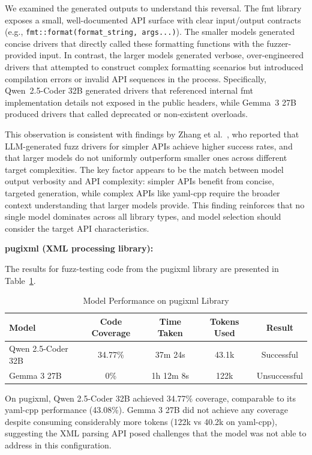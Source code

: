 We examined the generated outputs to understand this reversal. The fmt library exposes a small, well-documented API surface with clear input/output contracts (e.g., \texttt{fmt::format(format\_string, args...)}). The smaller models generated concise drivers that directly called these formatting functions with the fuzzer-provided input. In contrast, the larger models generated verbose, over-engineered drivers that attempted to construct complex formatting scenarios but introduced compilation errors or invalid API sequences in the process. Specifically, Qwen~2.5-Coder 32B generated drivers that referenced internal fmt implementation details not exposed in the public headers, while Gemma~3 27B produced drivers that called deprecated or non-existent overloads.

This observation is consistent with findings by Zhang et al.~\cite{LLMDriverGenEffectiveness2023}, who reported that LLM-generated fuzz drivers for simpler APIs achieve higher success rates, and that larger models do not uniformly outperform smaller ones across different target complexities. The key factor appears to be the match between model output verbosity and API complexity: simpler APIs benefit from concise, targeted generation, while complex APIs like yaml-cpp require the broader context understanding that larger models provide. This finding reinforces that no single model dominates across all library types, and model selection should consider the target API characteristics.

\textbf{pugixml (XML processing library):}

The results for fuzz-testing code from the pugixml library are presented in Table~\ref{tab:pugixml_results}.

\begin{table}[htbp]
\centering
\caption{Model Performance on pugixml Library}
\label{tab:pugixml_results}
\small
\begin{tabular}{lcccc}
\toprule
Model & Code Coverage & Time Taken & Tokens Used & Result \\
\midrule
Qwen 2.5-Coder 32B & 34.77\% & 37m 24s & 43.1k & Successful \\
Gemma 3 27B & 0\% & 1h 12m 8s & 122k & Unsuccessful \\
\bottomrule
\end{tabular}
\end{table}

On pugixml, Qwen 2.5-Coder 32B achieved 34.77\% coverage, comparable to its yaml-cpp performance (43.08\%). Gemma 3 27B did not achieve any coverage despite consuming considerably more tokens (122k vs 40.2k on yaml-cpp), suggesting the XML parsing API posed challenges that the model was not able to address in this configuration.

